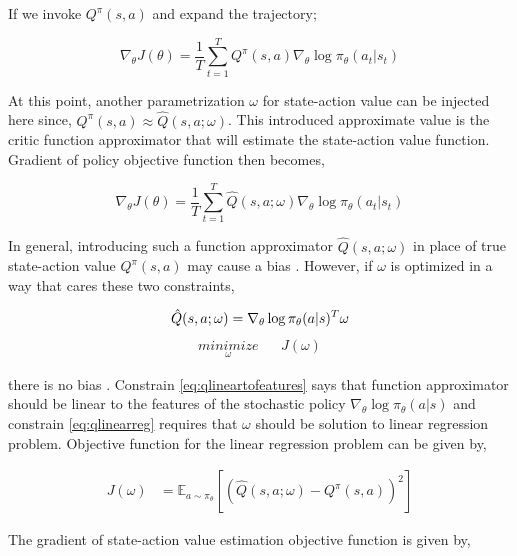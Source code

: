 \documentclass{ituphdreport}
\begin{document}
If we invoke $Q^\pi(s,a)$ and expand the trajectory;

\begin{equation}
\label{eq:abc}
\nabla_\theta J(\theta) = \frac{1}{T}\sum_{t=1}^{T} Q^\pi(s,a) \nabla_{\theta} \log \pi_\theta (a_t|s_t)
\end{equation}

At this point, another parametrization $\omega$ for state-action value can be injected here since, $Q^\pi(s,a) \approx \hat{Q}(s,a;\omega)$. This introduced approximate value is the critic function approximator that will estimate the state-action value function. Gradient of policy objective function then becomes,

\begin{equation}
\label{eq:abc}
\nabla_\theta J(\theta) = \frac{1}{T}\sum_{t=1}^{T} \hat{Q}(s,a;\omega) \nabla_{\theta} \log \pi_\theta (a_t|s_t)
\end{equation}


In general, introducing such a function approximator 
$\hat{Q}(s,a;\omega)$ in place of true state-action value $Q^\pi(s,a)$ may cause a bias \cite{silver2014deterministic}. However, if $\omega$ is optimized in a way that cares these two constraints,

\begin{equation}
		\label{eq:qlineartofeatures}
		\hat{Q}(s,a;\omega) = \nabla_{\theta} \log \pi_\theta (a|s)^T\omega \\
\end{equation}
\begin{equation}
	\begin{aligned}
	\label{eq:qlinearreg}
	\underset{\omega}{{minimize }} & & J(\omega) 
	\end{aligned}
\end{equation}

 
there is no bias \cite{sutton2000policy}. Constrain \ref{eq:qlineartofeatures} says that function approximator should be linear to the features of the stochastic policy $\nabla_{\theta} \log \pi_\theta (a|s)$ and constrain \ref{eq:qlinearreg} requires that $\omega$ should be solution to linear regression problem. Objective function for the linear regression problem can be given by,

\begin{align}
	\label{eq:abc}
	J(\omega) &=  \mathbb{E}_{a \sim \pi_\theta}[(\hat{Q}(s,a;\omega) - Q^\pi(s,a))^2]
\end{align}


\iffalse
The gradient of state-action value estimation objective function is given by,
\end{document}

